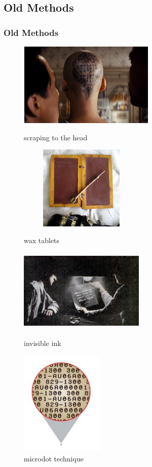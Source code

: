\documentclass[12pt,hyperref={unicode}]{beamer}
\begin{document}
\subsection{Old Methods}
\begin{frame}
\frametitle{Old Methods}
\begin{figure}

    \begin{overprint}
        \centering\includegraphics[width=6.5cm, height=4cm]{rushhour3nl11}\caption{scraping to the head}
        \centering\includegraphics[width=6cm, height=4cm]{WaxTablet}\caption{wax tablets}
        \centering\includegraphics[width=6cm, height=4cm]{ink2.jpg}\caption{invisible ink}
        \centering\includegraphics[width=4cm, height=5cm]{microdot.jpg}\caption{microdot technique}

\end{overprint}
\end{figure}
\end{frame}
\end{document}
